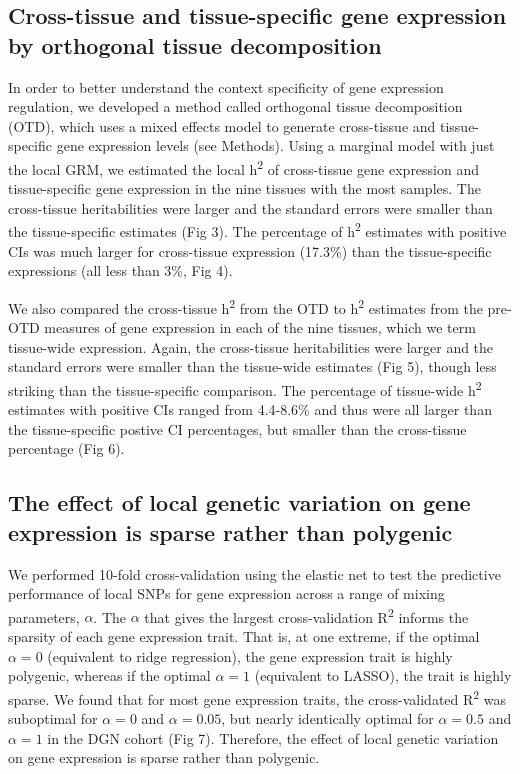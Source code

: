 \documentclass[]{article}
\begin{document}
\subsection{Cross-tissue and tissue-specific gene expression by
orthogonal tissue
decomposition}\label{cross-tissue-and-tissue-specific-gene-expression-by-orthogonal-tissue-decomposition}

In order to better understand the context specificity of gene expression
regulation, we developed a method called orthogonal tissue decomposition
(OTD), which uses a mixed effects model to generate cross-tissue and
tissue-specific gene expression levels (see Methods). Using a marginal
model with just the local GRM, we estimated the local
h\textsuperscript{2} of cross-tissue gene expression and tissue-specific
gene expression in the nine tissues with the most samples. The
cross-tissue heritabilities were larger and the standard errors were
smaller than the tissue-specific estimates (Fig 3). The percentage of
h\textsuperscript{2} estimates with positive CIs was much larger for
cross-tissue expression (17.3\%) than the tissue-specific expressions
(all less than 3\%, Fig 4).

We also compared the cross-tissue h\textsuperscript{2} from the OTD to
h\textsuperscript{2} estimates from the pre-OTD measures of gene
expression in each of the nine tissues, which we term tissue-wide
expression. Again, the cross-tissue heritabilities were larger and the
standard errors were smaller than the tissue-wide estimates (Fig 5),
though less striking than the tissue-specific comparison. The percentage
of tissue-wide h\textsuperscript{2} estimates with positive CIs ranged
from 4.4-8.6\% and thus were all larger than the tissue-specific postive
CI percentages, but smaller than the cross-tissue percentage (Fig 6).

\subsection{The effect of local genetic variation on gene expression is
sparse rather than
polygenic}\label{the-effect-of-local-genetic-variation-on-gene-expression-is-sparse-rather-than-polygenic}

We performed 10-fold cross-validation using the elastic net to test the
predictive performance of local SNPs for gene expression across a range
of mixing parameters, \(\alpha\). The \(\alpha\) that gives the largest
cross-validation R\textsuperscript{2} informs the sparsity of each gene
expression trait. That is, at one extreme, if the optimal \(\alpha=0\)
(equivalent to ridge regression), the gene expression trait is highly
polygenic, whereas if the optimal \(\alpha=1\) (equivalent to LASSO),
the trait is highly sparse. We found that for most gene expression
traits, the cross-validated R\textsuperscript{2} was suboptimal for
\(\alpha=0\) and \(\alpha=0.05\), but nearly identically optimal for
\(\alpha=0.5\) and \(\alpha=1\) in the DGN cohort (Fig 7). Therefore,
the effect of local genetic variation on gene expression is sparse
rather than polygenic.
\end{document}

